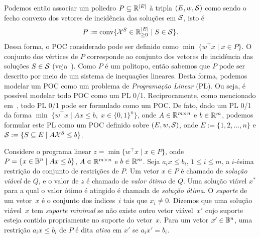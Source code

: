   Podemos então associar um poliedro $P \subseteq \mathbb{R}^{|E|}$ à tripla
  $(E, w, \mathcal{S})$ como sendo o fecho convexo dos vetores de incidência
  das soluções em $\mathcal{S}$, isto é
\begin{equation*}
\begin{split}
P :=  \text{conv}\{\mathcal{X}^{S} \in \mathbb{R}^{|E|}_{\ge 0}\; |\; S \in \mathcal{S}\}. 
\end{split}
\end{equation*}
Dessa forma, o POC considerado pode ser definido como
$\min \; \{w^{\intercal}x \; |\; x \in P\}$.  O conjunto dos vértices
de $P$ corresponde ao conjunto dos vetores de incidência das soluções
$S \in \mathcal{S}$ (veja~\cite{FerreiraW1996}). Como $P$ é um politopo,
então sabemos que $P$ pode ser descrito por meio de um sistema de
inequações lineares. Desta forma, podemos modelar um POC como um
problema de \emph{Programação Linear} (PL). Ou seja, é possível
modelar todo POC como um PL 0/1. Reciprocamente, como mencionado
em~\cite{FerreiraW1996}, todo PL 0/1 pode ser formulado como um
POC. De fato, dado um PL 0/1 da forma
$\min\; \{w^{\intercal}x \; |\; Ax \le b,\; x \in \{0,1\}^n \}$, onde
$A \in \mathbb{R}^{m \times n}$ e $b \in \mathbb{R}^{m}$, podemos formular este PL como
um POC definido sobre $(E, w, \mathcal{S})$, onde $E := \{1,2,...,n\}$ e
$\mathcal{S} := \{S \subseteq E\; |\; A\mathcal{X}^{S} \le b\}$.

Considere o programa linear
$z = \min\{w^{\intercal}x \; |\; x \in P\}$,
onde $P = \{x \in \mathbb{B}^{n} \; | \; Ax \le b\}$,
$A \in \mathbb{R}^{m \times n}$ e $b \in \mathbb{R}^{m}$.
Seja $a_ix \le b_i$, $1 \le i \le m$, a $i$-ésima restrição do conjunto de restrições de $P$.  
Um vetor $x \in P$ %
é chamado de
\emph{solução viável} de $Q$, e o valor de $z$ é chamado de
\emph{valor ótimo} de $Q$. Uma solução viável $x^*$ para a qual o valor ótimo é atingido é chamada de
\emph{solução ótima}. 
O \emph{suporte} de um vetor~$x$ é o conjunto dos índices~$i$ tais que
$x_i \ne 0$. Dizemos que uma solução viável~$x$ tem \emph{suporte
  minimal} se não existe outro vetor viável~$x'$ cujo suporte esteja
contido propriamente no suporte do vetor~$x$. 
Para um vetor $x' \in \mathbb{B}^{n}$, uma restrição 
$a_ix \le b_i$ de $P$  é dita \emph{ativa} em $x'$ se $a_ix' = b_i$. 


